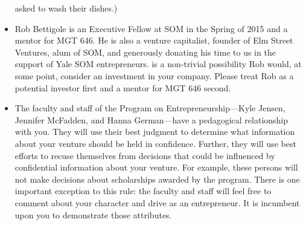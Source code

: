 \begin{itemize}
		asked to wash their dishes.)
	\item Rob Bettigole is an Executive Fellow at SOM in the Spring of 2015
		and a mentor for MGT 646.
		He is also a venture capitalist, founder of Elm Street Ventures,
		alum of SOM, and generously donating his time to us in the support
		of Yale SOM entrepreneurs.
		is a non-trivial possibility Rob would, at some point, consider an
		investment in your company. Please treat Rob as a potential
		investor first and a mentor for MGT 646 second.  
	\item The faculty and staff of the Program on Entrepreneurship---Kyle Jensen,
		Jennifer McFadden, and Hanna
		German---have a pedagogical relationship with you. They will 
		use their best judgment to determine what information about
		your venture should be held in confidence. Further, they will
		use best efforts to recuse themselves from decisions that could
		be influenced by confidential information about your venture.
		For example, these persons will not make decisions about scholarships
		awarded by the program. There is one important exception to this
		rule: the faculty and staff will feel free to comment about your
		character and drive as an entrepreneur. It is incumbent upon you
		to demonstrate those attributes.
\end{itemize}



  